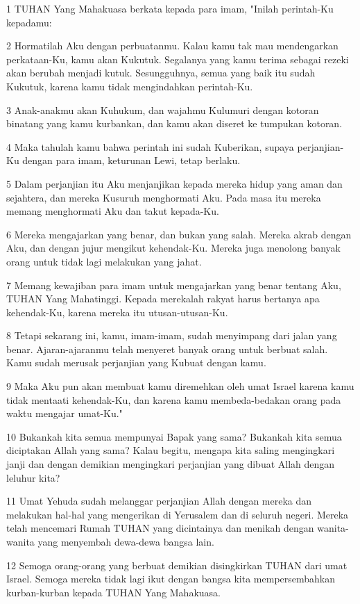 \par 1 TUHAN Yang Mahakuasa berkata kepada para imam, "Inilah perintah-Ku kepadamu:
\par 2 Hormatilah Aku dengan perbuatanmu. Kalau kamu tak mau mendengarkan perkataan-Ku, kamu akan Kukutuk. Segalanya yang kamu terima sebagai rezeki akan berubah menjadi kutuk. Sesungguhnya, semua yang baik itu sudah Kukutuk, karena kamu tidak mengindahkan perintah-Ku.
\par 3 Anak-anakmu akan Kuhukum, dan wajahmu Kulumuri dengan kotoran binatang yang kamu kurbankan, dan kamu akan diseret ke tumpukan kotoran.
\par 4 Maka tahulah kamu bahwa perintah ini sudah Kuberikan, supaya perjanjian-Ku dengan para imam, keturunan Lewi, tetap berlaku.
\par 5 Dalam perjanjian itu Aku menjanjikan kepada mereka hidup yang aman dan sejahtera, dan mereka Kusuruh menghormati Aku. Pada masa itu mereka memang menghormati Aku dan takut kepada-Ku.
\par 6 Mereka mengajarkan yang benar, dan bukan yang salah. Mereka akrab dengan Aku, dan dengan jujur mengikut kehendak-Ku. Mereka juga menolong banyak orang untuk tidak lagi melakukan yang jahat.
\par 7 Memang kewajiban para imam untuk mengajarkan yang benar tentang Aku, TUHAN Yang Mahatinggi. Kepada merekalah rakyat harus bertanya apa kehendak-Ku, karena mereka itu utusan-utusan-Ku.
\par 8 Tetapi sekarang ini, kamu, imam-imam, sudah menyimpang dari jalan yang benar. Ajaran-ajaranmu telah menyeret banyak orang untuk berbuat salah. Kamu sudah merusak perjanjian yang Kubuat dengan kamu.
\par 9 Maka Aku pun akan membuat kamu diremehkan oleh umat Israel karena kamu tidak mentaati kehendak-Ku, dan karena kamu membeda-bedakan orang pada waktu mengajar umat-Ku."
\par 10 Bukankah kita semua mempunyai Bapak yang sama? Bukankah kita semua diciptakan Allah yang sama? Kalau begitu, mengapa kita saling mengingkari janji dan dengan demikian mengingkari perjanjian yang dibuat Allah dengan leluhur kita?
\par 11 Umat Yehuda sudah melanggar perjanjian Allah dengan mereka dan melakukan hal-hal yang mengerikan di Yerusalem dan di seluruh negeri. Mereka telah mencemari Rumah TUHAN yang dicintainya dan menikah dengan wanita-wanita yang menyembah dewa-dewa bangsa lain.
\par 12 Semoga orang-orang yang berbuat demikian disingkirkan TUHAN dari umat Israel. Semoga mereka tidak lagi ikut dengan bangsa kita mempersembahkan kurban-kurban kepada TUHAN Yang Mahakuasa.
